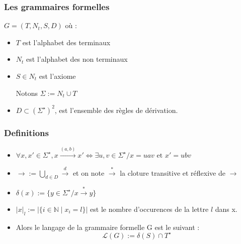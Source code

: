 \documentclass[12pt]{beamer}
\title{\letitle}
\author{\leauthor}
\date{}
\newcommand{\norm}[1]{\lvert #1 \rvert}
\begin{document}
\begin{frame}
\titlepage
\end{frame}
    \begin{frame}\frametitle{Les grammaires formelles}

$G = (T,N_t,S,D)$ où :
\begin{itemize}
\item $T$ est l'alphabet des terminaux
\item $N_t$ est l'alphabet des non terminaux
\item $S \in N_t$ est l'axiome

Notons $\Sigma := N_t \cup T$
\item $D \subset (\Sigma ^ \star )^2$, est l'ensemble des règles de dérivation.
\end{itemize}
\end{frame}

\begin{frame}\frametitle{Definitions}
\begin{itemize}
\item $\forall x,x' \in \Sigma^\star, x \overset{(a,b)}{\rightarrow} x' \iff \exists u,v \in \Sigma^\star / x = uav \text{ et } x' = ubv$

\item $\rightarrow := \bigcup_{d \in D} \overset{d}{\rightarrow}$ et on note $\overset{*}{\rightarrow}$ la cloture transitive et réflexive de $\rightarrow$

\item $\delta(x) := \{y \in \Sigma^\star / x \overset{*}{\rightarrow} y\}$

\item $\norm{x}_l := \norm{\{i \in \mathbb{N} \mid x_i = l \}}$ est le nombre d'occurences de la lettre $l$ dans x.

\item Alors le langage de la grammaire formelle  G est le suivant :
\begin{equation*}\mathcal{L} (G) := \delta(S) \cap T^\star\end{equation*}
\end{itemize}
\end{frame}
\end{document}

